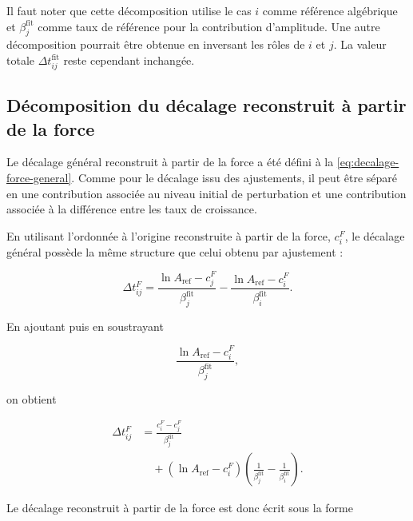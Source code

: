\documentclass[
    11pt,
    a4paper
]{article}
\begin{document}
Il faut noter que cette décomposition utilise le cas \(i\) comme référence
algébrique et \(\beta_j^{\mathrm{fit}}\) comme taux de référence pour la
contribution d’amplitude. Une autre décomposition pourrait être obtenue en
inversant les rôles de \(i\) et \(j\). La valeur totale
\(\Delta t_{ij}^{\mathrm{fit}}\) reste cependant inchangée.

\subsection{Décomposition du décalage reconstruit à partir de la force}
\label{subsec:decomposition-force-beta-differents}

Le décalage général reconstruit à partir de la force a été défini à la
\ref{eq:decalage-force-general}. Comme pour le décalage issu des ajustements,
il peut être séparé en une contribution associée au niveau initial de
perturbation et une contribution associée à la différence entre les taux de
croissance.

En utilisant l’ordonnée à l’origine reconstruite à partir de la force,
\(c_i^{F}\), le décalage général possède la même structure que celui obtenu par
ajustement :

\begin{equation}
    \Delta t_{ij}^{F}
    =
    \frac{
        \ln A_{\mathrm{ref}}-c_j^{F}
    }{
        \beta_j^{\mathrm{fit}}
    }
    -
    \frac{
        \ln A_{\mathrm{ref}}-c_i^{F}
    }{
        \beta_i^{\mathrm{fit}}
    }.
    \label{eq:dt-force-forme-ciF}
\end{equation}

En ajoutant puis en soustrayant

\begin{equation}
    \frac{
        \ln A_{\mathrm{ref}}-c_i^{F}
    }{
        \beta_j^{\mathrm{fit}}
    },
\end{equation}

on obtient

\begin{align}
    \Delta t_{ij}^{F}
    &=
    \frac{
        c_i^{F}-c_j^{F}
    }{
        \beta_j^{\mathrm{fit}}
    }
    \nonumber\\
    &\quad+
    \left(
        \ln A_{\mathrm{ref}}-c_i^{F}
    \right)
    \left(
        \frac{1}{\beta_j^{\mathrm{fit}}}
        -
        \frac{1}{\beta_i^{\mathrm{fit}}}
    \right).
    \label{eq:decomposition-dt-force-ciF}
\end{align}

Le décalage reconstruit à partir de la force est donc écrit sous la forme
\end{document}
